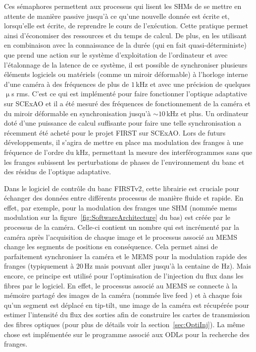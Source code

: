 Ces sémaphores permettent aux processus qui lisent les \ac{SHM}s de se mettre en attente de manière passive jusqu'à ce qu'une nouvelle donnée est écrite et, lorsqu'elle est écrite, de reprendre le cours de l'exécution. Cette pratique permet ainsi d'économiser des ressources et du temps de calcul. De plus, en les utilisant en combinaison avec la connaissance de la durée (qui en fait quasi-déterministe) que prend une action sur le système d'exploitation de l'ordinateur et avec l'étalonnage de la latence de ce système, il est possible de synchroniser plusieurs éléments logiciels ou matériels (comme un miroir déformable) à l'horloge interne d'une caméra à des fréquences de plus de $1 \,$kHz et avec une précision de quelques $\upmu$s rms. C'est ce qui est implémenté pour faire fonctionner l'optique adaptative sur \ac{SCExAO} et il a été mesuré des fréquences de fonctionnement de la caméra et du miroir déformable en synchronisation jusqu'à $\sim 10 \,$kHz et plus. Un ordinateur doté d'une puissance de calcul suffisante pour faire une telle synchronisation a récemment été acheté pour le projet \ac{FIRST} sur \ac{SCExAO}. Lors de futurs développements, il s'agira de mettre en place ma modulation des franges à une fréquence de l'ordre du kHz, permettant la mesure des interférogrammes sans que les franges subissent les perturbations de phases de l'environnement du banc et des résidus de l'optique adaptative.

Dans le logiciel de contrôle du banc \ac{FIRSTv2}, cette librairie est cruciale pour échanger des données entre différents processus de manière fluide et rapide. En effet, par exemple, pour la modulation des franges une \ac{SHM} (nommée \og mems modulation \fg sur la figure~\ref{fig:SoftwareArchitecture} du bas) est créée par le processus de la caméra. Celle-ci contient un nombre qui est incrémenté par la caméra après l'acquisition de chaque image et le processus associé au \ac{MEMS} change les segments de positions en conséquence. Cela permet ainsi de parfaitement synchroniser la caméra et le \ac{MEMS} pour la modulation rapide des franges (typiquement à $20 \,$Hz mais pouvant aller jusqu'à la centaine de Hz). Mais encore, ce principe est utilisé pour l'optimisation de l'injection du flux dans les fibres par le logiciel. En effet, le processus associé au \ac{MEMS} se connecte à la mémoire partagé des images de la caméra (nommée \og live feed \fg) et à chaque fois qu'un segment est déplacé en tip-tilt, une image de la caméra est récupérée pour estimer l'intensité du flux des sorties afin de construire les cartes de transmission des fibres optiques (pour plus de détails voir la section~\ref{sec:OptiInj}). La même chose est implémentée sur le programme associé aux \ac{ODL}s pour la recherche des franges.

